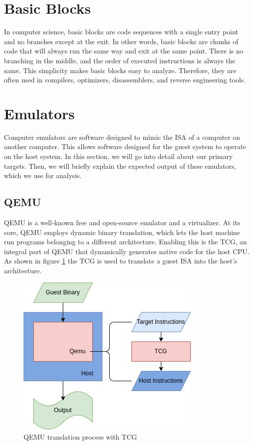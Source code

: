 \section{Basic Blocks}
In computer science, basic blocks are code sequences with a single entry point and no branches except at the exit.
In other words, basic blocks are chunks of code that will always run the same way and exit at the same point.
There is no branching in the middle, and the order of executed instructions is always the same.
This simplicity makes basic blocks easy to analyze.
Therefore, they are often used in compilers, optimizers, disassemblers, and reverse engineering tools.

\section{Emulators}

Computer emulators are software designed to mimic the ISA of a computer on another computer.
This allows software designed for the guest system to operate on the host system. 
In this section, we will go into detail about our primary targets.
Then, we will briefly explain the expected output of these emulators, which we use for analysis.

\subsection{QEMU}
\ac{QEMU} is a well-known free and open-source emulator and a virtualizer. 
At its core, \ac{QEMU} employs dynamic binary translation, which lets the host machine run programs belonging to a different architecture.
Enabling this is the \ac{TCG}, an integral part of \ac{QEMU} that dynamically generates native code for the host CPU.
As shown in figure \ref{fig:qemu_tcg} the \ac{TCG} is used to translate a guest \ac{ISA} into the host's architecture.

\begin{figure}[ht]
    \centering
    \includegraphics[width=0.7\linewidth]{figures/qemu_TCG2}
    \caption[QEMU translation process]{\ac{QEMU} translation process with \ac{TCG}}
    \label{fig:qemu_tcg}
\end{figure}

